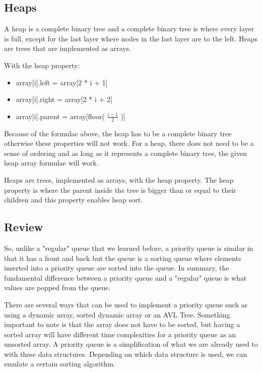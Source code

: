 \documentclass[11pt,a4paper,english]{report}
\begin{document}
\subsection{Heaps}

A heap is a complete binary tree and a complete binary tree is where every layer is full, except for the last layer where nodes in the last layer are to the left. Heaps are trees that are implemented as arrays.

\bigskip \noindent 
With the heap property:
\begin{itemize}
  \item array[i].left = array[2 * i + 1]
  \item array[i].right = array[2 * i + 2]
  \item array[i].parent = array[floor( $\frac{i - 1}{2}$ )]
\end{itemize}

\noindent Because of the formulae above, the heap has to be a complete binary tree otherwise these properties will not work. For a heap, there does not need to be a sense of ordering and as long as it represents a complete binary tree, the given heap array formulae will work.

\bigskip 
\noindent 
Heaps are trees, implemented as arrays, with the heap property. The heap property is where the parent inside the tree is bigger than or equal to their children and this property enables heap sort.


\subsection{Review}

So, unlike a "regular" queue that we learned before, a priority queue is similar in that it has a front and back but the queue is a sorting queue where elements inserted into a priority queue are sorted into the queue. In summary, the fundamental difference between a priority queue and a "regular" queue is what values are popped from the queue. 

\bigskip \noindent
There are several ways that can be used to implement a priority queue such as using a dynamic array, sorted dynamic array or an AVL Tree. Something important to note is that the array does not have to be sorted, but having a sorted array will have different time complexities for a priority queue as an unsorted array. A priority queue is a simplification of what we are already used to with these data structures. Depending on which data structure is used, we can emulate a certain sorting algorithm.
\end{document}
